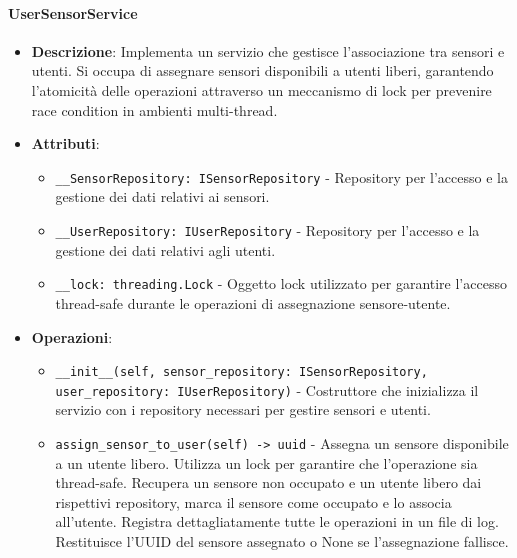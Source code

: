 \documentclass[10pt]{article}
\begin{document}
    \paragraph{UserSensorService}
    \begin{itemize} 
    \item \textbf{Descrizione}: Implementa un servizio che gestisce l'associazione tra sensori e utenti. Si occupa di assegnare sensori disponibili a utenti liberi, garantendo l'atomicità delle operazioni attraverso un meccanismo di lock per prevenire race condition in ambienti multi-thread.
    \item \textbf{Attributi}:
    \begin{itemize}
        \item \texttt{\_\_SensorRepository: ISensorRepository} - Repository per l'accesso e la gestione dei dati relativi ai sensori.
        \item \texttt{\_\_UserRepository: IUserRepository} - Repository per l'accesso e la gestione dei dati relativi agli utenti.
        \item \texttt{\_\_lock: threading.Lock} - Oggetto lock utilizzato per garantire l'accesso thread-safe durante le operazioni di assegnazione sensore-utente.
    \end{itemize}
    
    \item \textbf{Operazioni}:
    \begin{itemize}
        \item \texttt{\_\_init\_\_(self, sensor\_repository: ISensorRepository, user\_repository: IUserRepository)} - Costruttore che inizializza il servizio con i repository necessari per gestire sensori e utenti.
        
        \item \texttt{assign\_sensor\_to\_user(self) -> uuid} - Assegna un sensore disponibile a un utente libero. Utilizza un lock per garantire che l'operazione sia thread-safe. Recupera un sensore non occupato e un utente libero dai rispettivi repository, marca il sensore come occupato e lo associa all'utente. Registra dettagliatamente tutte le operazioni in un file di log. Restituisce l'UUID del sensore assegnato o None se l'assegnazione fallisce.
    \end{itemize}
    \end{itemize}
\end{document}
